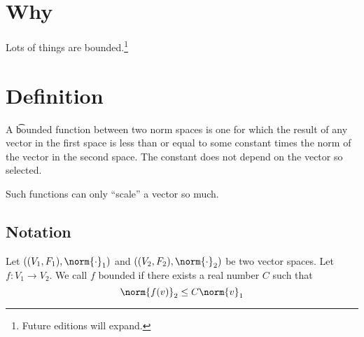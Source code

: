 
\section*{Why}

Lots of things are bounded.\footnote{Future editions will expand.}

\section*{Definition}

A \t{bounded function} between two norm spaces is one for which the result of any vector in the first space is less than or equal to some constant times the norm of the vector in the second space.
The constant does not depend on the vector so selected.

Such functions can only ``scale'' a vector so much.

\subsection*{Notation}

Let $((V_1, F_1), \norm{\cdot}_1)$ and $((V_2, F_2), \norm{\cdot}_2)$ be two vector spaces.
Let $f: V_1 \to V_2$.
We call $f$ bounded if there exists a real number $C$ such that
\[
\norm{f(v)}_2 \leq C \norm{v}_1
\]

\blankpage